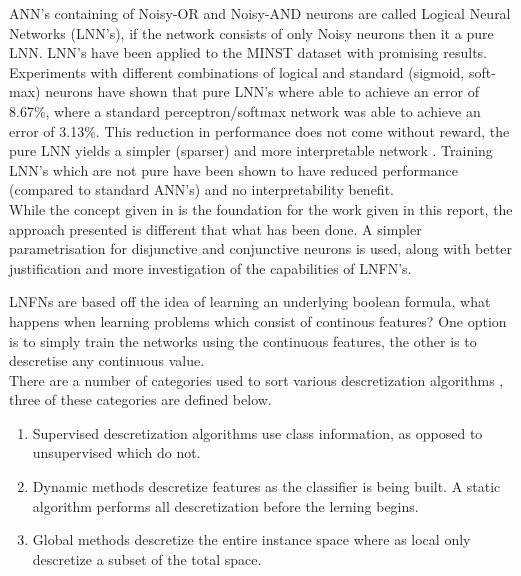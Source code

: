 ANN's containing of Noisy-OR and Noisy-AND neurons are called Logical Neural Networks (LNN's), if the network consists of only Noisy neurons then it a pure LNN. LNN's have been applied to the MINST dataset with promising results. Experiments with different combinations of logical and standard (sigmoid, soft-max) neurons have shown that pure LNN's where able to achieve an error of 8.67\%, where a standard perceptron/softmax network was able to achieve an error of 3.13\%. This reduction in performance does not come without reward, the pure LNN yields a simpler (sparser) and more interpretable network \cite{LearningLogicalActivations}. Training LNN's which are not pure have been shown to have reduced performance (compared to standard ANN's) and no interpretability benefit.\\

While the concept given in \cite{herrmann1996backpropagation} is the foundation for the work given in this report, the approach presented is different that what has been done. A simpler parametrisation for disjunctive and conjunctive neurons is used, along with better justification and more investigation of the capabilities of LNFN's.


LNFNs are based off the idea of learning an underlying boolean formula, what happens when learning problems which consist of continous features? One option is to simply train the networks using the continuous features, the other is to descretise any continuous value.\\


There are a number of categories used to sort various descretization algorithms \cite{liu2002discretization}, three of these categories are defined below.

\begin{enumerate}
	\item {} Supervised descretization algorithms use class information, as opposed to unsupervised which do not.
	
	\item {} Dynamic methods descretize features as the classifier is being built. A static algorithm performs all descretization before the lerning begins.
	
	\item {} Global methods descretize the entire instance space where as local only descretize a subset of the total space.
\end{enumerate}

